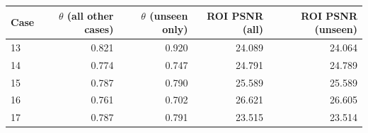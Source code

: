 \begin{tabular}{lrrrr}
\toprule
Case & $\theta$ (all other cases) & $\theta$ (unseen only) & ROI PSNR (all) & ROI PSNR (unseen) \\
\midrule
13 & 0.821 & 0.920 & 24.089 & 24.064 \\
14 & 0.774 & 0.747 & 24.791 & 24.789 \\
15 & 0.787 & 0.790 & 25.589 & 25.589 \\
16 & 0.761 & 0.702 & 26.621 & 26.605 \\
17 & 0.787 & 0.791 & 23.515 & 23.514 \\
\bottomrule
\end{tabular}
